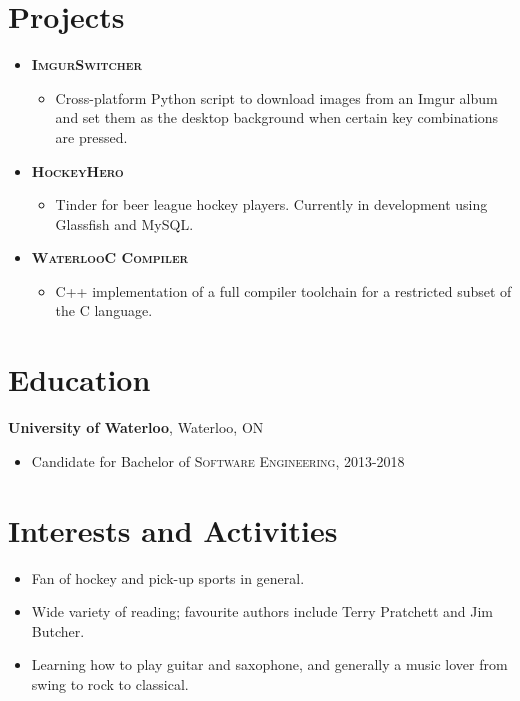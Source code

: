 \documentclass[a4paper,10pt]{article}
\begin{document}
\section{Projects}
\begin{itemize}
	\item {\textsc{\textbf{ImgurSwitcher}}}
	\begin{itemize}
		\item {Cross-platform Python script to download images from an Imgur album and set them as the desktop background when certain key combinations are pressed.}
	\end{itemize}
	
	\item {\textsc{\textbf{HockeyHero}}}
	\begin{itemize}
		\item {Tinder for beer league hockey players. Currently in development using Glassfish and MySQL.}
	\end{itemize}
	
	\item {\textsc{\textbf{WaterlooC Compiler}}}
	\begin{itemize}
		\item {C++ implementation of a full compiler toolchain for a restricted subset of the C language.}
	\end{itemize}	
\end{itemize}

\section{Education}
\textbf{University of Waterloo}, Waterloo, ON
\begin{itemize}
	\item Candidate for Bachelor of \textsc{Software Engineering}, 2013-2018
\end{itemize}

\section{Interests and Activities}
\begin{itemize}
	\item {Fan of hockey and pick-up sports in general.}
	\item {Wide variety of reading; favourite authors include Terry Pratchett and Jim Butcher.}
	\item {Learning how to play guitar and saxophone, and generally a music lover from swing to rock to classical.}
\end{itemize}
\end{document}
